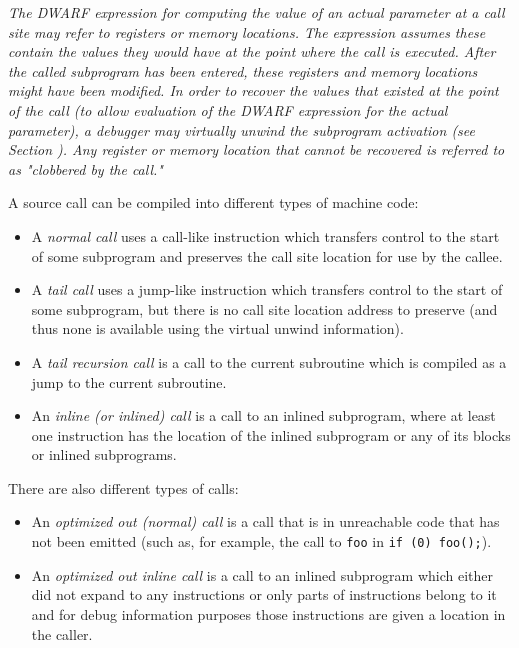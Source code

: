 \textit{The DWARF expression for computing the value of an actual parameter at
a call site may refer to registers or memory locations.  The expression
assumes these contain the values they would have at the point where the
call is executed. After the called subprogram has been entered, these
registers and memory locations might have been modified.  In order to
recover the values that existed at the point of the call (to allow
evaluation of the DWARF expression for the actual parameter), a debugger
may virtually unwind the subprogram activation
(see Section ). Any
register or memory location that cannot be recovered is referred to as
"clobbered by the call."}

A source call can be compiled into different types of machine code:
\begin{itemize}
\item
A \textit{normal call} uses a call-like instruction which transfers
control to the start of some subprogram and preserves the call site
location for use by the callee.

\item
A \textit{tail call} uses a jump-like instruction which
transfers control to the start of some subprogram, but
there is no call site location address to preserve
(and thus none is available using the
virtual unwind information).

\item
A \textit{tail recursion call} is a call
to the current subroutine which is compiled as a jump
to the current subroutine.

\item
An \textit{inline (or inlined) call} is a call to an inlined subprogram,
where at least one instruction has the location of the inlined subprogram
or any of its blocks or inlined subprograms.
\end{itemize}

There are also different types of  calls:
\begin{itemize}
\item
An \textit{optimized out (normal) call} is a call that is in unreachable code that
has not been emitted (such as, for example, the call to \texttt{foo} in
\texttt{if (0) foo();}).
\item
An \textit{optimized out inline call}
is a call to an inlined subprogram which either did not expand to any instructions
or only parts of instructions belong to it and for debug information purposes those
instructions are given a location in the caller.
\end{itemize}

